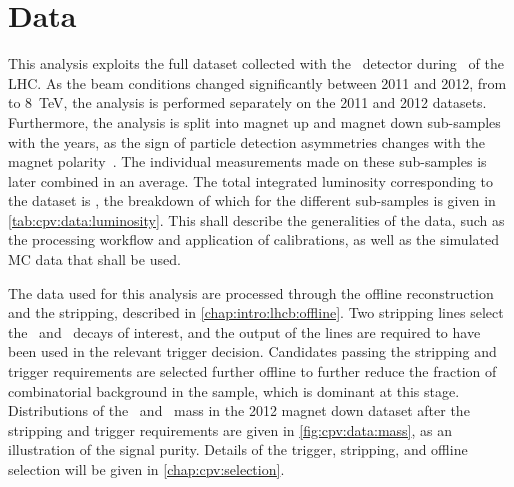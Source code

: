 \chapter{Data}
\label{chap:cpv:data}

This analysis exploits the full dataset collected with the \lhcb\ detector 
during \runone\ of the \ac{LHC}.
As the beam conditions changed significantly between 2011 and 2012, from 
 to \SI{8}{\TeV}, the analysis is performed separately on the 2011 
and 2012 datasets.
Furthermore, the analysis is split into magnet up and magnet down sub-samples 
with the years, as the sign of particle detection asymmetries changes with the 
magnet polarity~\cite{Vesterinen:1642153}.
The individual measurements made on these sub-samples is later combined in an 
average.
The total integrated luminosity corresponding to the dataset is \totlumi, the 
breakdown of which for the different sub-samples is given in 
\cref{tab:cpv:data:luminosity}.
This  shall describe the generalities of the data, such 
as the processing workflow and application of calibrations, as well as the 
simulated \ac{MC} data that shall be used.

The data used for this analysis are processed through the offline 
reconstruction and the stripping, described in \cref{chap:intro:lhcb:offline}.
Two stripping lines select the \LcTopKK\ and \LcToppipi\ decays of interest, 
and the output of the lines are required to have been used in the relevant 
trigger decision.
Candidates passing the stripping and trigger requirements are selected further 
offline to further reduce the fraction of combinatorial background in the 
sample, which is dominant at this stage.
Distributions of the \pKK\ and \ppipi\ mass in the 2012 magnet down dataset 
after the stripping and trigger requirements are given in 
\cref{fig:cpv:data:mass}, as an illustration of the signal purity.
Details of the trigger, stripping, and offline selection will be given in 
\cref{chap:cpv:selection}.

